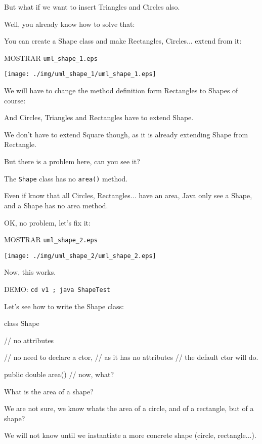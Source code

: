 \documentclass[a4paper, 9pt]{extarticle}
\begin{document}
But what if we want to insert Triangles and Circles also.

Well, you already know how to solve that:

You can create a Shape class and make Rectangles, Circles... extend from it:

MOSTRAR \verb+uml_shape_1.eps+
\begin{center}
  \texttt{[image: ./img/uml\_shape\_1/uml\_shape\_1.eps]}
\end{center}

We will have to change the method definition form Rectangles to Shapes of
course:


And Circles, Triangles and Rectangles have to extend Shape.

We don't have to extend Square though, as it is already extending Shape from Rectangle.

But there is a problem here, can you see it?

The \texttt{Shape} class has no \texttt{area()} method.

Even if know that all Circles, Rectangles... have an area, Java only see a
Shape, and a Shape has no area method.

OK, no problem, let's fix it:

MOSTRAR \verb+uml_shape_2.eps+
\begin{center}
  \texttt{[image: ./img/uml\_shape\_2/uml\_shape\_2.eps]}
\end{center}

Now, this works.

DEMO: \verb+cd v1 ; java ShapeTest+

Let's see how to write the Shape class:

\begin{blackboard}
class Shape {
  // no attributes

  // no need to declare a ctor,
  // as it has no attributes
  // the default ctor will do.

  public double area() {
    // now, what?
  }
}
\end{blackboard}

What is the area of a shape?

We are not sure, we know whats the area of a circle, and of a rectangle, but of a shape?

We will not know until we instantiate a more concrete shape (circle, rectangle...).
\end{document}
